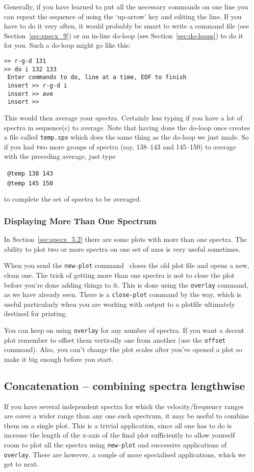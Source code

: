 Generally, if you have learned to put all the necessary commands on
one line you can repeat the sequence of using the `up-arrow' key and
editing the line. If you have to do it very often, it would probably
be smart to write a command file (see Section~\ref{sec:specx_9}) or an
in-line do-loop (see Section~\ref{sec:do-loops}) to do it for
you. Such a do-loop might go like this:
\begin{verbatim}
>> r-g-d 131
>> do i 132 133
 Enter commands to do, line at a time, EOF to finish
 insert >> r-g-d i
 insert >> ave
 insert >>  
\end{verbatim}
This would then average your spectra. Certainly less typing if you
have a lot of spectra in sequence(s) to average. Note that having done
the do-loop once creates a file called {\tt temp.spx} which does the
same thing as the do-loop we just made. So if you had two more groups
of spectra (say, 138--143 and 145--150) to average with the preceding
average, just type 

\SP\ \verb|@temp 138 143|\\
\SP\ \verb|@temp 145 150|

to complete the set of spectra to be averaged. 

\subsubsection{Displaying More Than One Spectrum}
\label{sec:specx_8.3}
In Section~\ref{sec:specx_5.2} there are some plots with more than one
spectra. The ability to plot two or more spectra on one set of axes is
very useful sometimes.

When you send the {\tt new-plot} command \SPECX\ closes the old plot
file and opens a new, clean one.  The trick of getting more than one
spectra is not to close the plot before you're done adding things to
it. This is done using the {\tt overlay} command, as we have already
seen. There is a {\tt close-plot} command by the way, which is useful
particularly when you are working with output to a plotfile ultimately
destined for printing.

You can keep on using {\tt overlay} for any number of spectra. If you
want a decent plot remember to offset them vertically one from another
(use the {\tt offset} command). Also, you can't change the plot scales
after you've opened a plot so make it big enough before you start.

\subsection{Concatenation -- combining spectra lengthwise}
If you have several independent spectra for which the
velocity/frequency ranges are cover a wider range than any one such
spectrum, it may be useful to combine them on a single plot. This is a
trivial application, since all one has to do is increase the length of
the x-axis of the final plot sufficiently to allow yourself room to
plot all the spectra using {\tt new-plot} and successive applications
of {\tt overlay}. There are however, a couple of more specialised
applications, which we get to next.

